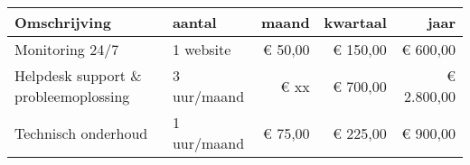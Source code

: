 

\setlength\extrarowheight{5pt}
\begin{tabular}{| p{6.2cm} | l | r | r | r |} \hline
  \rowcolor{gray!20}\bf{Omschrijving} & \bf{aantal} & \bf{maand} & \bf{kwartaal} & \bf{jaar} \\[5pt] \hline
  Monitoring 24/7 & 1 website & € 50,00 & € 150,00 & € 600,00 \\[5pt] \hline
  Helpdesk support \& probleemoplossing & 3 uur/maand & € xx & € 700,00 & € 2.800,00 \\[5pt] \hline
  Technisch onderhoud & 1 uur/maand & € 75,00 & € 225,00 & € 900,00 \\[5pt] \hline
\end{tabular}
